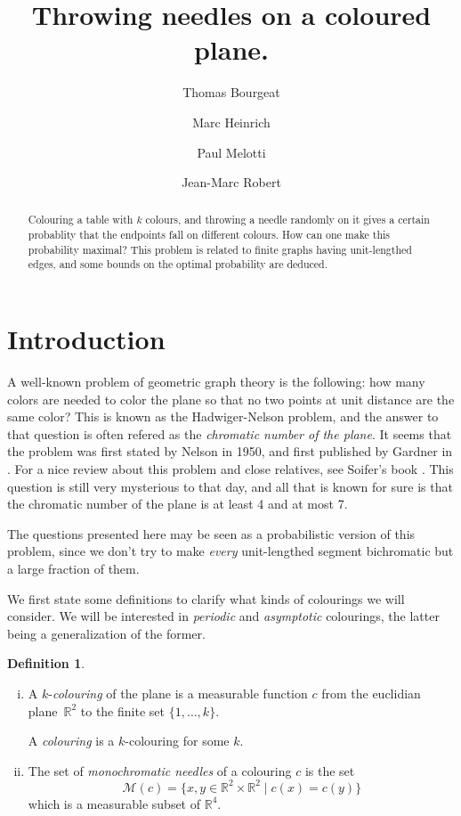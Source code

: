 \documentclass[a4paper,11pt]{article}
\title{Throwing needles on a coloured plane.}
\author{Thomas Bourgeat \and Marc Heinrich \and Paul Melotti 
\and Jean-Marc Robert}
\theoremstyle{definition}
\newtheorem{definition}{Definition}
\theoremstyle{remark}
\newcommand{\R}{\mathbb{R}}
\newcommand{\M}{\mathcal{M}}
\begin{document}
\maketitle

\begin{abstract} Colouring a table with $k$ colours, and throwing a needle
randomly on it gives a certain probablity that the endpoints fall on 
different colours. How can one make this probability maximal?
This problem is related to finite graphs having unit-lengthed edges, and 
some bounds on the optimal probability are deduced.\end{abstract}

\section{Introduction}

A well-known problem of geometric graph theory is the following: how many colors
are needed to color the plane so that no two points at unit distance are the 
same color? This is known as the Hadwiger-Nelson problem, and the answer to that
question is often refered as the \textit{chromatic number of the plane}. It 
seems that the problem was first stated by Nelson in 1950, and first published by 
Gardner in \cite{gardner}.
For a nice review about this problem and close relatives, see Soifer's book
\cite{soifer}. This question is still very mysterious to that day, and all that 
is known for sure is that the chromatic number of the plane is at least 4 and at
most 7.

The questions presented here may be seen as a probabilistic version of this 
problem, since we don't try to make \textit{every} unit-lengthed segment 
bichromatic but a large fraction of them.

We first state some definitions to clarify what kinds of colourings we will consider.
We will be interested in \textit{periodic} and \textit{asymptotic} colourings,
the latter being a generalization of the former.
\begin{definition}
\
\begin{enumerate}[i)] 
\item A $k$-\textit{colouring} of the plane is a measurable function $c$ from the euclidian 
plane~$\R ^2$ to the finite set $\{1, \dots , k \}$.

A \textit{colouring} is a $k$-colouring for some $k$.
\item The set of \textit{monochromatic needles} of a colouring $c$ is the set
\[ \M (c) = \{x,y \in \R ^2 \times \R ^2 \mid c(x) = c(y) \} \]
which is a measurable subset of $\R ^4$.
\end{enumerate}
\end{definition}
\end{document}
